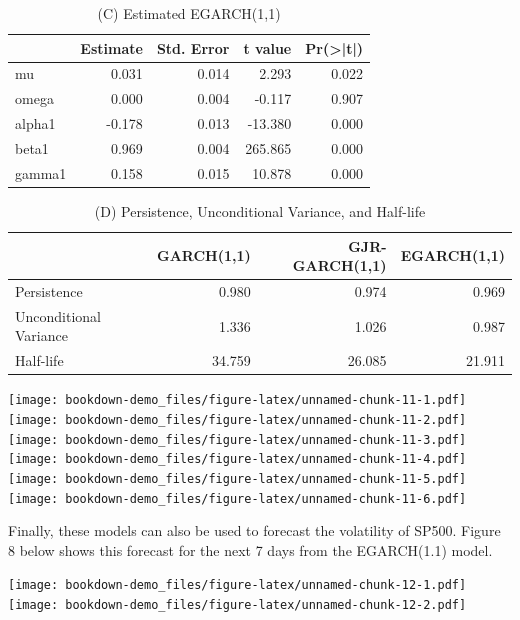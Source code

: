 \documentclass[]{book}
\theoremstyle{definition}
\theoremstyle{definition}
\theoremstyle{definition}
\theoremstyle{remark}
\begin{document}
\begin{table}[t]

\caption{\label{tab:unnamed-chunk-11}(C) Estimated EGARCH(1,1)}
\centering
\begin{tabular}{l|r|r|r|r}
\hline
  &  Estimate &  Std. Error &  t value & Pr(>|t|)\\
\hline
mu & 0.031 & 0.014 & 2.293 & 0.022\\
\hline
omega & 0.000 & 0.004 & -0.117 & 0.907\\
\hline
alpha1 & -0.178 & 0.013 & -13.380 & 0.000\\
\hline
beta1 & 0.969 & 0.004 & 265.865 & 0.000\\
\hline
gamma1 & 0.158 & 0.015 & 10.878 & 0.000\\
\hline
\end{tabular}
\end{table}

\begin{table}[t]

\caption{\label{tab:unnamed-chunk-11}(D) Persistence, Unconditional Variance, and Half-life}
\centering
\begin{tabular}{l|r|r|r}
\hline
  & GARCH(1,1) & GJR-GARCH(1,1) & EGARCH(1,1)\\
\hline
Persistence & 0.980 & 0.974 & 0.969\\
\hline
Unconditional Variance & 1.336 & 1.026 & 0.987\\
\hline
Half-life & 34.759 & 26.085 & 21.911\\
\hline
\end{tabular}
\end{table}

\texttt{[image: bookdown-demo\_files/figure-latex/unnamed-chunk-11-1.pdf]} \texttt{[image: bookdown-demo\_files/figure-latex/unnamed-chunk-11-2.pdf]} \texttt{[image: bookdown-demo\_files/figure-latex/unnamed-chunk-11-3.pdf]} \texttt{[image: bookdown-demo\_files/figure-latex/unnamed-chunk-11-4.pdf]} \texttt{[image: bookdown-demo\_files/figure-latex/unnamed-chunk-11-5.pdf]} \texttt{[image: bookdown-demo\_files/figure-latex/unnamed-chunk-11-6.pdf]}

Finally, these models can also be used to forecast the volatility of SP500. Figure 8 below shows this forecast for the next 7 days from the EGARCH(1.1) model.

\texttt{[image: bookdown-demo\_files/figure-latex/unnamed-chunk-12-1.pdf]} \texttt{[image: bookdown-demo\_files/figure-latex/unnamed-chunk-12-2.pdf]}


\end{document}
